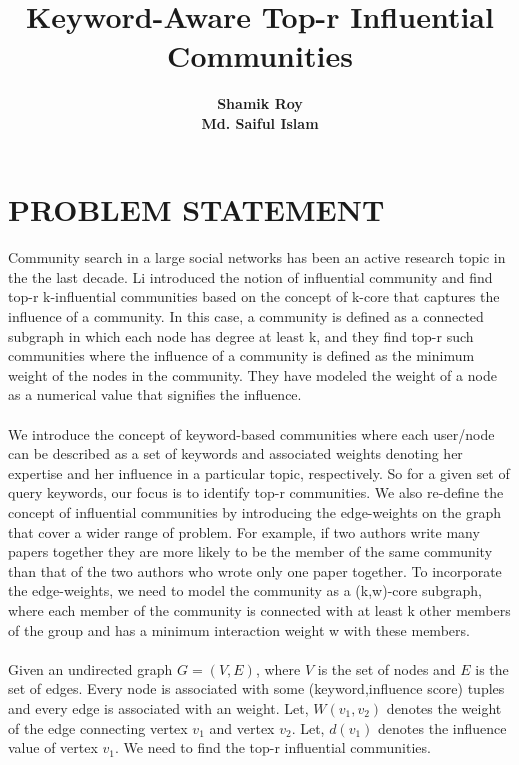 \documentclass{article}
\author{\LARGE \textbf{Shamik Roy}\\\LARGE \textbf{Md. Saiful Islam}\\\LARGE}
\title{\Huge \textbf{Keyword-Aware Top-r Influential Communities} \vspace{5.0cm}}
\date{}
\begin{document}
	\maketitle
	\thispagestyle{empty}
	\newpage
	\tableofcontents
	\newpage
	
	\section{PROBLEM STATEMENT}
	\paragraph{}Community search in a large social networks has been an active research topic in the the last decade. Li introduced the notion of influential community and find top-r k-influential communities based on the concept of k-core that captures the influence of a community. In this case, a community is defined as a connected subgraph in which each node has degree at least k, and they find top-r such communities where the influence of a community is defined as the minimum weight of the nodes in the community. They have modeled the weight of a node as a numerical value that signifies the influence.
	
	\paragraph{}We introduce the concept of keyword-based communities where each user/node can be described as a set of keywords and associated weights denoting her expertise and her influence in a particular topic, respectively. So for a given set of query keywords, our focus is to identify top-r communities. We also re-define the concept of influential communities by introducing the edge-weights on the graph that cover a wider range of problem. For example, if two authors write many papers together they are more likely to be the member of the same community than that of the two authors who wrote only one paper together. To incorporate the edge-weights, we need to model the community as a (k,w)-core subgraph, where each member of the community is connected with at least k other members of the group and has a minimum interaction weight w with these members.
	
	\paragraph{}Given an undirected graph $G=(V,E)$, where $V$ is the set of nodes and $E$ is the set of edges. Every node is associated with some (keyword,influence score) tuples and every edge is associated with an weight. Let, $W(v_{1},v_{2})$ denotes the weight of the edge connecting vertex $v_{1}$ and vertex $v_{2}$. Let, $d(v_{1})$ denotes the influence value of vertex $v_{1}$. We need to find the top-r influential communities.
		
\end{document}
